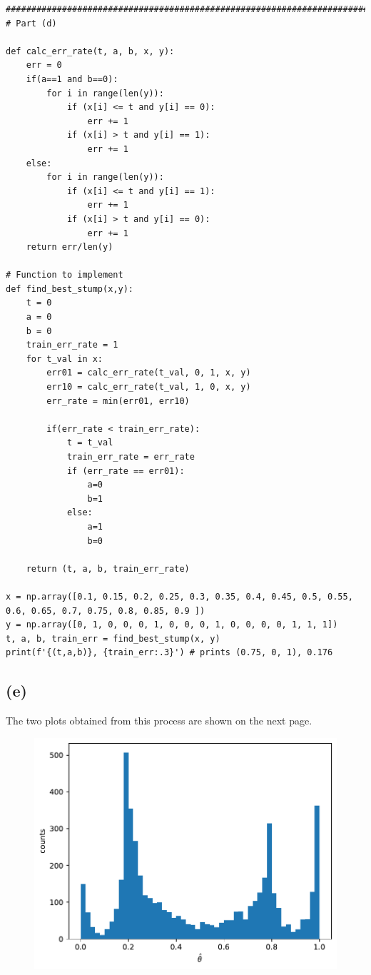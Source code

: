 \documentclass[11pt]{article}
\begin{document}
\begin{verbatim}
################################################################################
# Part (d)

def calc_err_rate(t, a, b, x, y):
    err = 0
    if(a==1 and b==0):
        for i in range(len(y)):
            if (x[i] <= t and y[i] == 0):
                err += 1
            if (x[i] > t and y[i] == 1):
                err += 1
    else:
        for i in range(len(y)):
            if (x[i] <= t and y[i] == 1):
                err += 1
            if (x[i] > t and y[i] == 0):
                err += 1
    return err/len(y)

# Function to implement
def find_best_stump(x,y):
    t = 0
    a = 0
    b = 0
    train_err_rate = 1
    for t_val in x:
        err01 = calc_err_rate(t_val, 0, 1, x, y)
        err10 = calc_err_rate(t_val, 1, 0, x, y)
        err_rate = min(err01, err10)
        
        if(err_rate < train_err_rate):
            t = t_val
            train_err_rate = err_rate
            if (err_rate == err01):
                a=0
                b=1
            else:
                a=1
                b=0
    
    return (t, a, b, train_err_rate)

x = np.array([0.1, 0.15, 0.2, 0.25, 0.3, 0.35, 0.4, 0.45, 0.5, 0.55, 0.6, 0.65, 0.7, 0.75, 0.8, 0.85, 0.9 ])
y = np.array([0, 1, 0, 0, 0, 1, 0, 0, 0, 1, 0, 0, 0, 0, 1, 1, 1])
t, a, b, train_err = find_best_stump(x, y)
print(f'{(t,a,b)}, {train_err:.3}') # prints (0.75, 0, 1), 0.176
\end{verbatim}

\subsection*{(e)}
The two plots obtained from this process are shown on the next page.
\begin{figure}
    \centering
    \includegraphics{images/2fthreshold.pdf}
\end{figure}
\end{document}
